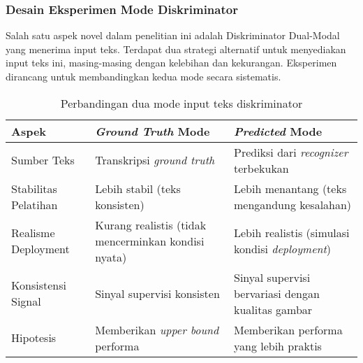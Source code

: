 \documentclass[12pt,a4paper]{article}
\begin{document}
\subsubsection{Desain Eksperimen Mode Diskriminator}
Salah satu aspek novel dalam penelitian ini adalah Diskriminator Dual-Modal yang menerima input teks. Terdapat dua strategi alternatif untuk menyediakan input teks ini, masing-masing dengan kelebihan dan kekurangan. Eksperimen dirancang untuk membandingkan kedua mode secara sistematis.

\begin{table}[H]
\centering
\caption{Perbandingan dua mode input teks diskriminator}
\label{tab:discriminator-modes}
\small
\begin{tabular}{|l|p{5.5cm}|p{5.5cm}|}
\hline
\textbf{Aspek} & \textbf{\textit{Ground Truth} Mode} & \textbf{\textit{Predicted} Mode} \\ \hline
Sumber Teks & Transkripsi \textit{ground truth} & Prediksi dari \textit{recognizer} terbekukan \\ \hline
Stabilitas Pelatihan & Lebih stabil (teks konsisten) & Lebih menantang (teks mengandung kesalahan) \\ \hline
Realisme Deployment & Kurang realistis (tidak mencerminkan kondisi nyata) & Lebih realistis (simulasi kondisi \textit{deployment}) \\ \hline
Konsistensi Signal & Sinyal supervisi konsisten & Sinyal supervisi bervariasi dengan kualitas gambar \\ \hline
Hipotesis & Memberikan \textit{upper bound} performa & Memberikan performa yang lebih praktis \\ \hline
\end{tabular}
\end{table}
\end{document}
